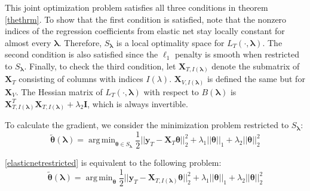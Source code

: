 \documentclass[10pt,letterpaper]{article}
\DeclareMathOperator*{\argmin}{arg\,min}
\begin{document}
This joint optimization problem satisfies all three conditions in theorem \ref{thethrm}.
To show that the first condition is satisfied, note that the nonzero indices of the regression coefficients from elastic net stay locally constant for almost every $\boldsymbol{\lambda}$. Therefore, $S_{\boldsymbol{\lambda}}$ is a local optimality space for $L_T(\cdot, \boldsymbol{\lambda})$.
The second condition is also satisfied since the $\ell_1$ penalty is smooth when restricted to $S_{\boldsymbol{\lambda}}$.
Finally, to check the third condition, let $\boldsymbol{X}_{T, I(\boldsymbol\lambda)}$ denote the submatrix of $\boldsymbol{X}_{T}$ consisting of columns with indices $I(\lambda)$. $\boldsymbol{X}_{V, I(\boldsymbol\lambda)}$ is defined the same but for $\boldsymbol{X}_V$. The Hessian matrix of $L_T(\cdot, \boldsymbol{\lambda})$ with respect to $B(\boldsymbol\lambda)$ is $\boldsymbol{X}_{T, I(\boldsymbol\lambda)}^T\boldsymbol{X}_{T, I(\boldsymbol\lambda)} + \lambda_2 \boldsymbol{I}$, which is always invertible.

To calculate the gradient, we consider the minimization problem restricted to $S_{\boldsymbol{\lambda}}$:
\begin{equation}
\tilde{\boldsymbol{\theta}}(\boldsymbol{\lambda}) =
\argmin_{\boldsymbol\theta \in S_{\boldsymbol{\lambda}}}
\frac{1}{2} ||\boldsymbol{y}_T - \boldsymbol{X}_{T} \boldsymbol{\theta}||^2_2 + \lambda_1 ||\boldsymbol{\theta}||_1 + \lambda_2 ||\boldsymbol{\theta}||_2^2
\label{elasticnetrestricted}
\end{equation}

\eqref{elasticnetrestricted} is equivalent to the following problem:
\begin{equation}
\tilde{\boldsymbol{\theta}}(\boldsymbol{\lambda}) =
\argmin_{\boldsymbol\theta}
\frac{1}{2} ||\boldsymbol{y}_T - \boldsymbol{X}_{T, I(\boldsymbol\lambda)} \boldsymbol{\theta}||^2_2 + \lambda_1 ||\boldsymbol{\theta}||_1 + \lambda_2 ||\boldsymbol{\theta}||_2^2
\label{elasticnetrestricted1}
\end{equation}
\end{document}
